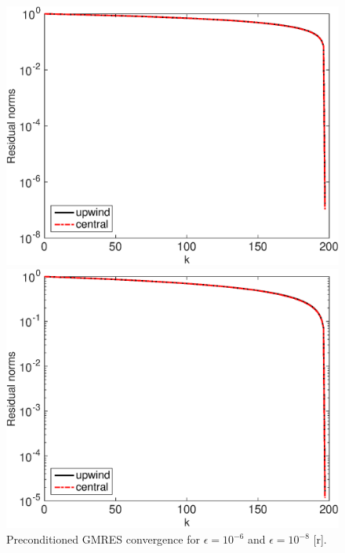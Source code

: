%
\begin{figure}[h!]
\begin{minipage}[t]{0.48\linewidth}
\includegraphics[width=0.98\linewidth]{figures/gmres_eps_1e-06_N_198}
\end{minipage}
%
\begin{minipage}[t]{0.48\linewidth}
\includegraphics[width=0.98\linewidth]{figures/gmres_eps_1e-08_N_198}
\end{minipage}
\caption{Preconditioned GMRES convergence for $\epsilon=10^{-6}$ and $\epsilon=10^{-8}$ [r].}
\label{fig:back:GMRES.N198.eps8}
\end{figure}

